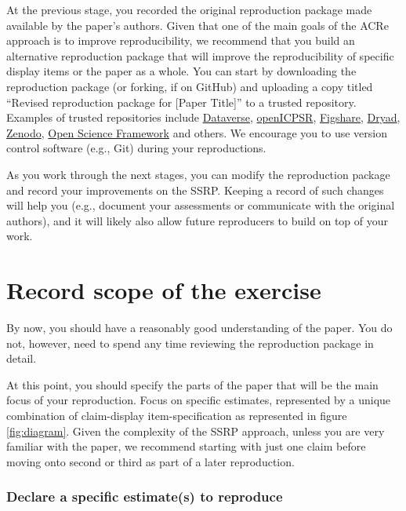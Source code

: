 \documentclass[
]{book}
\begin{document}
At the previous stage, you recorded the original reproduction package made available by the paper's authors. Given that one of the main goals of the ACRe approach is to improve reproducibility, we recommend that you build an alternative reproduction package that will improve the reproducibility of specific display items or the paper as a whole.
You can start by downloading the reproduction package (or forking, if on GitHub) and uploading a copy titled ``Revised reproduction package for {[}Paper Title{]}'' to a trusted repository. Examples of trusted repositories include \href{https://dataverse.org/}{Dataverse}, \href{https://www.openicpsr.org/openicpsr/}{openICPSR}, \href{https://figshare.com}{Figshare}, \href{https://datadryad.org/stash}{Dryad}, \href{https://about.zenodo.org/}{Zenodo}, \href{osf.io/}{Open Science Framework} and others. We encourage you to use version control software (e.g., Git) during your reproductions.

As you work through the next stages, you can modify the reproduction package and record your improvements on the SSRP. Keeping a record of such changes will help you (e.g., document your assessments or communicate with the original authors), and it will likely also allow future reproducers to build on top of your work.

\hypertarget{declare-estimates}{%
\section{Record scope of the exercise}\label{declare-estimates}}

By now, you should have a reasonably good understanding of the paper. You do not, however, need to spend any time reviewing the reproduction package in detail.

At this point, you should specify the parts of the paper that will be the main focus of your reproduction. Focus on specific estimates, represented by a unique combination of claim-display item-specification as represented in figure \ref{fig:diagram}. Given the complexity of the SSRP approach, unless you are very familiar with the paper, we recommend starting with just one claim before moving onto second or third as part of a later reproduction.

\hypertarget{declare-a-specific-estimates-to-reproduce}{%
\subsubsection*{Declare a specific estimate(s) to reproduce}\label{declare-a-specific-estimates-to-reproduce}}
\end{document}

